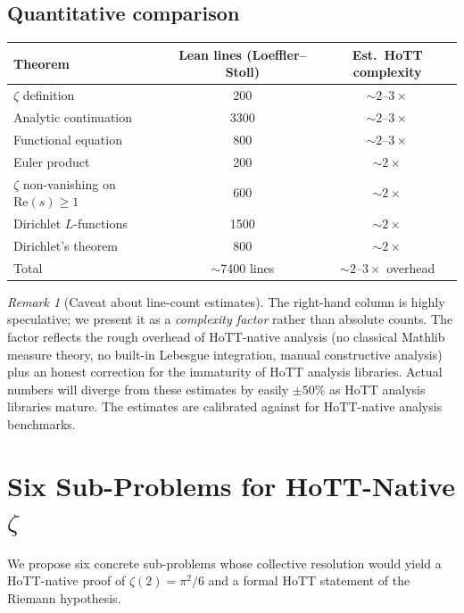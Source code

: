 \documentclass[12pt]{article}
\theoremstyle{definition}
\theoremstyle{remark}
\newtheorem{remark}[theorem]{Remark}
\begin{document}
\subsection{Quantitative comparison}\label{subsec:LSquant}

\begin{center}
\begin{tabular}{lcc}
\toprule
Theorem & Lean lines (Loeffler--Stoll) & Est.\ HoTT complexity \\
\midrule
$\zeta$ definition & 200 & $\sim 2$--$3\times$ \\
Analytic continuation & 3300 & $\sim 2$--$3\times$ \\
Functional equation & 800 & $\sim 2$--$3\times$ \\
Euler product & 200 & $\sim 2\times$ \\
$\zeta$ non-vanishing on $\mathrm{Re}(s) \geq 1$ & 600 & $\sim 2\times$ \\
Dirichlet $L$-functions & 1500 & $\sim 2\times$ \\
Dirichlet's theorem & 800 & $\sim 2\times$ \\
\midrule
Total & $\sim$7400 lines & $\sim 2$--$3\times$ overhead \\
\bottomrule
\end{tabular}
\end{center}

\medskip

\begin{remark}[Caveat about line-count estimates]
The right-hand column is highly speculative; we present it as a
\emph{complexity factor} rather than absolute counts. The factor reflects
the rough overhead of HoTT-native analysis (no classical Mathlib measure
theory, no built-in Lebesgue integration, manual constructive analysis)
plus an honest correction for the immaturity of HoTT analysis libraries.
Actual numbers will diverge from these estimates by easily $\pm 50\%$ as
HoTT analysis libraries mature. The estimates are calibrated against
\cite{Booij2020} for HoTT-native analysis benchmarks.
\end{remark}

\section{Six Sub-Problems for HoTT-Native \texorpdfstring{$\zeta$}{Zeta}}\label{sec:roadmap}

We propose six concrete sub-problems whose collective resolution would yield
a HoTT-native proof of $\zeta(2) = \pi^2/6$ and a formal HoTT statement of
the Riemann hypothesis.
\end{document}
